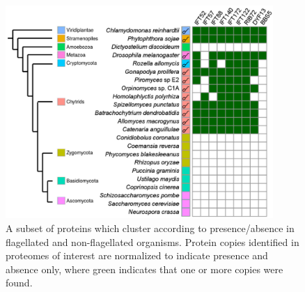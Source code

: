 
\begin{figure}
  \includegraphics[width=4in]{./Appendix/img/flagDataHeatmap_subset.png}
  \caption[Heatmap cluster analysis of flagellar proteins from \textit{Naegleria gruberi}]{A subset of proteins which cluster according to presence/absence in flagellated and non-flagellated organisms. Protein copies identified in proteomes of interest are normalized to indicate presence and absence only, where green indicates that one or more copies were found.}
  \label{fig:AppFlag_heatmap}
\end{figure}
